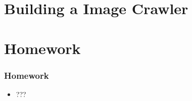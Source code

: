 \documentclass{beamer}
\begin{document}
\section{Building a Image Crawler}
\section{Homework}
\begin{frame}[fragile]
\frametitle{Homework}
\begin{itemize}
\item ???
\end{itemize}
\end{frame}
\end{document}
